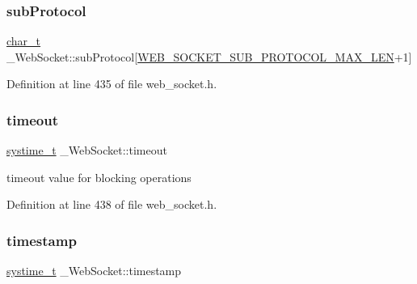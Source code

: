 \mbox{\label{struct__WebSocket_a6342b26e8c294f6b28252eb5510f8b4a}} 
\subsubsection{\texorpdfstring{sub\+Protocol}{subProtocol}}
{\footnotesize\ttfamily \hyperlink{compiler__port_8h_a40bb5262bf908c328fbcfbe5d29d0201}{char\+\_\+t} \+\_\+\+Web\+Socket\+::sub\+Protocol\mbox{[}\hyperlink{web__socket_8h_a5a98133b0c199ecd9542c4c6d9388550}{W\+E\+B\+\_\+\+S\+O\+C\+K\+E\+T\+\_\+\+S\+U\+B\+\_\+\+P\+R\+O\+T\+O\+C\+O\+L\+\_\+\+M\+A\+X\+\_\+\+L\+EN}+1\mbox{]}}



Definition at line 435 of file web\+\_\+socket.\+h.

\mbox{\label{struct__WebSocket_a5d2b33265ae63f5457c339b4d4388169}} 
\subsubsection{\texorpdfstring{timeout}{timeout}}
{\footnotesize\ttfamily \hyperlink{compiler__port_8h_ae3e32a98d431a02106616da3071832dd}{systime\+\_\+t} \+\_\+\+Web\+Socket\+::timeout}



timeout value for blocking operations 



Definition at line 438 of file web\+\_\+socket.\+h.

\mbox{\label{struct__WebSocket_a3f80a5666d9dfca72b23169f5ea43a76}} 
\subsubsection{\texorpdfstring{timestamp}{timestamp}}
{\footnotesize\ttfamily \hyperlink{compiler__port_8h_ae3e32a98d431a02106616da3071832dd}{systime\+\_\+t} \+\_\+\+Web\+Socket\+::timestamp}



